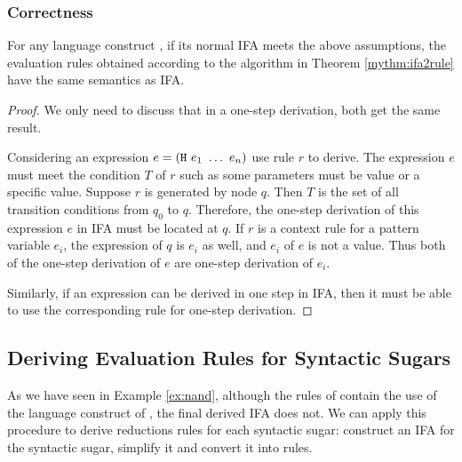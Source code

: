 \subsubsection{Correctness}

\begin{lemma}
    \label{lemma:ifa2rule-correct}
    For any language construct , if its normal IFA meets the above assumptions, the evaluation rules obtained according to the algorithm in Theorem \ref{mythm:ifa2rule} have the same semantics as IFA.
\end{lemma}


\begin{proof}
    We only need to discuss that in a one-step derivation, both get the same result.

    Considering an expression $e=(\mbox{\tt H}~e_1~\ldots~e_n)$ use rule $r$ to derive. The expression $e$ must meet the condition $T$ of $r$ such as some parameters must be value or a specific value. Suppose $r$ is generated by node $q$. Then $T$ is the set of all transition conditions from $q_0$ to $q$. Therefore, the one-step derivation of this expression $e$ in IFA must be located at $q$. If $r$ is a context rule for a pattern variable $e_i$, the expression of $q$ is $e_i$ as well, and $e_i$ of $e$ is not a value. Thus both of the one-step derivation of $e$ are one-step derivation of $e_i$.

    Similarly, if an expression can be derived in one step in IFA, then it must be able to use the corresponding rule for one-step derivation.
\end{proof}

\subsection{Deriving Evaluation Rules for Syntactic Sugars}

As we have seen in Example \ref{ex:nand}, although  the rules of  contain the use of the language construct of , the final derived IFA does not. We can apply this procedure to derive reductions rules for each syntactic sugar: construct an  IFA for the  syntactic sugar, simplify it and convert it into rules.

